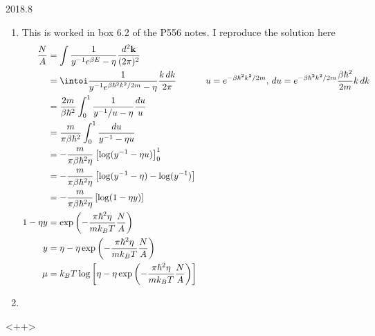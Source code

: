 \documentclass[12pt]{article}
\begin{document}
\renewcommand{\kk}{\mathbf{k}}
\begin{solution}{2018.8}
\begin{enumerate}
\item
This is worked in box 6.2 of the P556 notes. I reproduce the solution here
\begin{align*}
\frac{N}{A} & = \int \frac{1}{y^{-1} e^{\beta E} - \eta} \frac{d^2 \kk}{(2\pi)^2} \\
& = \intoi \frac{1}{y^{-1} e^{\beta \hbar^2 k^2/2m} - \eta} \frac{k \, dk}{2\pi} 
& u = e^{-\beta \hbar^2 k^2/2m}, \, du = e^{-\beta \hbar^2 k^2/2m} \frac{\beta \hbar^2}{2m} k \, dk \\
& = \frac{2m}{\beta \hbar^2} \int_0^1 \frac{1}{y^{-1}/u - \eta} \frac{du}{u} \\
& = \frac{m}{\pi \beta \hbar^2} \int_0^1 \frac{du}{y^{-1} - \eta u } \\
& = -\frac{m}{\pi \beta \hbar^2 \eta} \left[ \log (y^{-1} - \eta u) \right]_0^1 \\
& = -\frac{m}{\pi \beta \hbar^2 \eta} \left[ \log (y^{-1} - \eta) - \log(y^{-1}) \right] \\
& = -\frac{m}{\pi \beta \hbar^2 \eta} \left[ \log (1 - \eta y) \right] \\
1 - \eta y & = \exp \left( - \frac{\pi \hbar^2 \eta}{m k_B T} \frac{N}{A} \right) \\
y & = \eta - \eta \exp \left( - \frac{\pi \hbar^2 \eta}{m k_B T} \frac{N}{A} \right) \\
\mu & = k_B T \log \left[ \eta - \eta \exp \left( - \frac{\pi \hbar^2 \eta}{m k_B T} \frac{N}{A} \right) \right]
\end{align*}

\item


\end{enumerate}
<++>
\end{solution}
\end{document}
